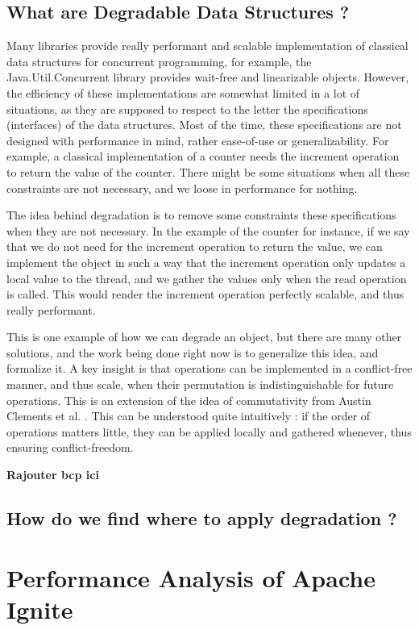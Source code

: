 \documentclass[conference]{IEEEtran}
\begin{document}
\subsection{What are Degradable Data Structures ?}
Many libraries provide really performant and scalable implementation of classical data structures for concurrent programming, for example, the Java.Util.Concurrent library \cite{java_concurrent} provides wait-free and linearizable objects. However, the efficiency of these implementations are somewhat limited in a lot of situations, as they are supposed to respect to the letter the specifications (interfaces) of the data structures. Most of the time, these specifications are not designed with performance in mind, rather ease-of-use or generalizability. For example, a classical implementation of a counter needs the increment operation to return the value of the counter. There might be some situations when all these constraints are not necessary, and we loose in performance for nothing.

The idea behind degradation is to remove some constraints these specifications when they are not necessary. In the example of the counter for instance, if we say that we do not need for the increment operation to return the value, we can implement the object in such a way that the increment operation only updates a local value to the thread, and we gather the values only when the read operation is called. This would render the increment operation perfectly scalable, and thus really performant.

This is one example of how we can degrade an object, but there are many other solutions, and the work being done right now is to generalize this idea, and formalize it. A key insight is that operations can be implemented in a conflict-free manner, and thus scale, when their permutation is indistinguishable for future operations. This is an extension of the idea of commutativity from Austin Clements et al. \cite{scalable}. This can be understood quite intuitively : if the order of operations matters little, they can be applied locally and gathered whenever, thus ensuring conflict-freedom.

\textbf{Rajouter bcp ici}


\subsection{How do we find where to apply degradation ?}
\bigbreak
\bigbreak

\section{Performance Analysis of Apache Ignite}
\end{document}

